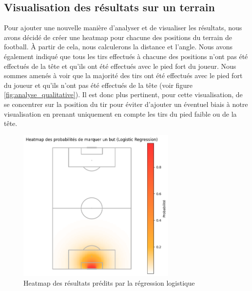 \documentclass[12pt]{article}
\begin{document}
\newpage

\subsection{Visualisation des résultats sur un terrain}
Pour ajouter une nouvelle manière d'analyser et de visualiser les résultats, nous avons décidé de créer une heatmap pour chacune des positions du terrain de football.
À partir de cela, nous calculerons la distance et l'angle. 
Nous avons également indiqué que tous les tirs effectués à chacune des positions n'ont pas été effectués de la tête et qu'ils ont été effectués avec le pied fort du joueur.
Nous sommes amenés à voir que la majorité des tirs ont été effectués avec le pied fort du joueur et qu'ils n'ont pas été effectués de la tête (voir figure \ref{fig:analyse_qualitative}).
Il est donc plus pertinent, pour cette visualisation, de se concentrer sur la position du tir pour éviter d'ajouter un éventuel biais à notre visualisation en prenant uniquement en compte les tirs du pied faible ou de la tête.

\begin{figure}[htp]
    \centering
    \includegraphics[width=0.7\textwidth]{img/pitch_visualisation_log_reg.png}
    \caption{Heatmap des résultats prédits par la régression logistique}
    \label{fig:result_log_reg}
\end{figure}
\end{document}
